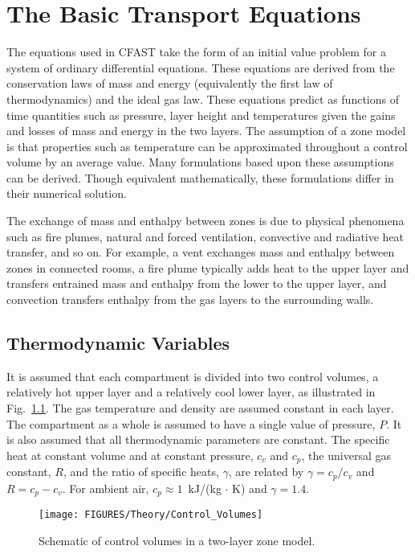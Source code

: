 \chapter{The Basic Transport Equations}
\label{sec:Theory_Chapter}

The equations used in CFAST take the form of an initial value problem for a system of ordinary differential equations. These equations are derived from the conservation laws of mass and energy (equivalently the first law of thermodynamics) and the ideal gas law. These equations predict as functions of time quantities such as pressure, layer height and temperatures given the gains and losses of mass and energy in the two layers. The assumption of a zone model is that properties such as temperature can be approximated throughout a control volume by an average value. Many formulations based upon these assumptions can be derived. Though equivalent mathematically, these formulations differ in their numerical solution.

The exchange of mass and enthalpy between zones is due to physical phenomena such as fire plumes, natural and forced ventilation, convective and radiative heat transfer, and so on. For example, a vent exchanges mass and enthalpy between zones in connected rooms, a fire plume typically adds heat to the upper layer and transfers entrained mass and enthalpy from the lower to the upper layer, and convection transfers enthalpy from the gas layers to the surrounding walls.

\section{Thermodynamic Variables}


It is assumed that each compartment is divided into two control volumes, a relatively hot upper layer and a relatively cool lower layer, as illustrated in Fig.~\ref{fig:Control_Volumes}. The gas temperature and density are assumed constant in each layer. The compartment as a whole is assumed to have a single value of pressure, $P$. It is also assumed that all thermodynamic parameters are constant. The specific heat at constant volume and at constant pressure, $c_v$ and $c_p$, the universal gas constant, $R$, and the ratio of specific heats, $\gamma$, are related by $\gamma = c_p / c_v$ and $R = c_p- c_v$.  For ambient air, $c_p \approx 1$~kJ/(kg $\cdot$ K) and $\gamma = 1.4$.
\begin{figure}[h]
\begin{center}
\texttt{[image: FIGURES/Theory/Control\_Volumes]}\\
\end{center}
\caption{Schematic of control volumes in a two-layer zone model.}
 \label{fig:Control_Volumes}
\end{figure}

